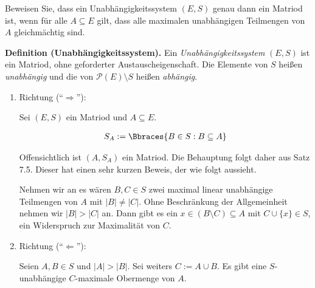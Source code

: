 
\begin{exercise}

Beweisen Sie, dass ein Unabhängigkeitssystem $(E, S)$ genau dann ein Matriod ist, wenn für alle $A \subseteq E$ gilt, dass alle maximalen unabhängigen Teilmengen von $A$ gleichmächtig sind.

\end{exercise}


\begin{solution}

\phantom{}


\textbf{Definition (Unabhängigkeitssystem).}
Ein \textit{Unabhängigkeitssystem} $(E, S)$ ist ein Matriod, ohne geforderter Austauscheigenschaft.
Die Elemente von $S$ heißen \textit{unabhängig} und die von $\mathcal{P}(E) \setminus S$ heißen \textit{abhängig}.

\begin{enumerate}[label = \arabic*.]

    \item Richtung (\enquote{$\Rightarrow$}):


    Sei $(E, S)$ ein Matriod und $A \subseteq E$.

    \begin{align*}
        S_A := \Bbraces{B \in S: B \subseteq A}
    \end{align*}

    Offensichtlich ist $(A, S_A)$ ein Matriod.
    Die Behauptung folgt daher aus Satz 7.5. Dieser hat einen sehr kurzen Beweis, der wie folgt aussieht.
    
   	Nehmen wir an es wären $B,C \in S$ zwei maximal linear unabhängige Teilmengen von $A$ mit $|B| \neq |C|$. Ohne Beschränkung der Allgemeinheit nehmen wir $|B| > |C|$ an. Dann gibt es ein $x \in (B \setminus C) \subseteq A$  mit $C \cup \{x\} \in S$, ein Widerspruch zur Maximalität von $C$. 

    \item Richtung (\enquote{$\Leftarrow$}):
    
    Seien $A, B \in S$ und $|A| > |B|$.
    Sei weiters $C := A \cup B$.
    Es gibt eine $S$-unabhängige $C$-maximale Obermenge von $A$.


\end{enumerate}
\end{solution}
